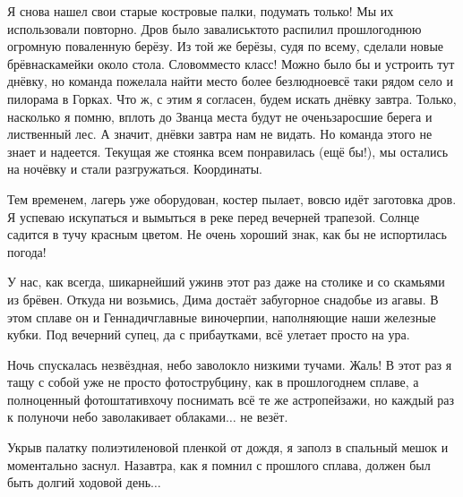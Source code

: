 Я снова нашел свои старые костровые палки, подумать только! Мы их использовали повторно. Дров было завались\mdash кто\sdash то распилил прошлогоднюю огромную поваленную берёзу. Из той же берёзы, судя по всему, сделали новые брёвна\sdash скамейки около стола. Словом\mdash место класс! Можно было бы и устроить тут днёвку, но команда пожелала найти место более безлюдное\mdash всё таки рядом село и пилорама в Горках. Что ж, с этим я согласен, будем искать днёвку завтра. Только, насколько я помню, вплоть до Званца места будут не очень\mdash заросшие берега и лиственный лес. А значит, днёвки завтра нам не видать. Но команда этого не знает и надеется. Текущая же стоянка всем понравилась (ещё бы!), мы остались на ночёвку и стали разгружаться. Координаты\mdash \CoordsChagodoschaMegrino.

Тем временем, лагерь уже оборудован, костер пылает, вовсю идёт заготовка дров. Я успеваю искупаться и вымыться в реке перед вечерней трапезой. Солнце садится в тучу красным цветом. Не очень хороший знак, как бы не испортилась погода!  

У нас, как всегда, шикарнейший ужин\mdash в этот раз даже на столике и со скамьями из брёвен. Откуда ни возьмись, Дима достаёт забугорное снадобье из агавы. В этом сплаве он и Геннадич\mdash главные виночерпии, наполняющие наши железные кубки. Под вечерний супец, да с прибаутками, всё улетает просто на ура. 

Ночь спускалась незвёздная, небо заволокло низкими тучами. Жаль! В этот раз я тащу с собой уже не просто фотострубцину, как в прошлогоднем сплаве, а полноценный фотоштатив\mdash хочу поснимать всё те же астропейзажи, но каждый раз к полуночи небо заволакивает облаками$\ldots$ не везёт.

Укрыв палатку полиэтиленовой пленкой от дождя, я заполз в спальный мешок и моментально заснул. Назавтра, как я помнил с прошлого сплава, должен был быть долгий ходовой день$\ldots$ 

\begin{center}
\end{center}
